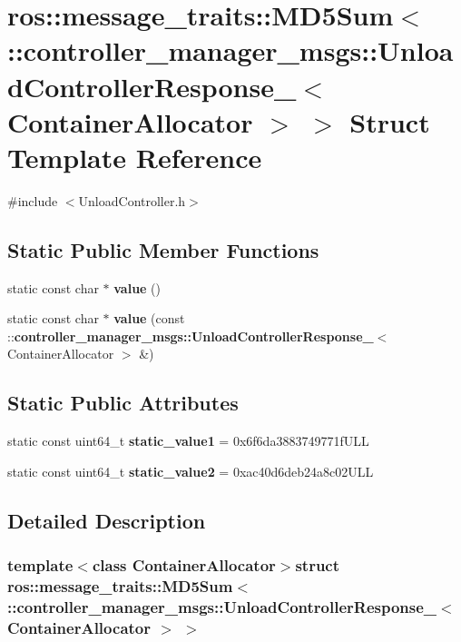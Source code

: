 \section{ros\-:\-:message\-\_\-traits\-:\-:\-M\-D5\-Sum$<$ \-:\-:controller\-\_\-manager\-\_\-msgs\-:\-:\-Unload\-Controller\-Response\-\_\-$<$ \-Container\-Allocator $>$ $>$ \-Struct \-Template \-Reference}
\label{structros_1_1message__traits_1_1MD5Sum_3_01_1_1controller__manager__msgs_1_1UnloadControllerResp3e483afae2c259a8c8d4fb8e7c645045}


{\ttfamily \#include $<$\-Unload\-Controller.\-h$>$}

\subsection*{\-Static \-Public \-Member \-Functions}
\begin{DoxyCompactItemize}
\item 
static const char $\ast$ {\bf value} ()
\item 
static const char $\ast$ {\bf value} (const \-::{\bf controller\-\_\-manager\-\_\-msgs\-::\-Unload\-Controller\-Response\-\_\-}$<$ \-Container\-Allocator $>$ \&)
\end{DoxyCompactItemize}
\subsection*{\-Static \-Public \-Attributes}
\begin{DoxyCompactItemize}
\item 
static const uint64\-\_\-t {\bf static\-\_\-value1} = 0x6f6da3883749771f\-U\-L\-L
\item 
static const uint64\-\_\-t {\bf static\-\_\-value2} = 0xac40d6deb24a8c02\-U\-L\-L
\end{DoxyCompactItemize}


\subsection{\-Detailed \-Description}
\subsubsection*{template$<$class Container\-Allocator$>$struct ros\-::message\-\_\-traits\-::\-M\-D5\-Sum$<$ \-::controller\-\_\-manager\-\_\-msgs\-::\-Unload\-Controller\-Response\-\_\-$<$ Container\-Allocator $>$ $>$}



